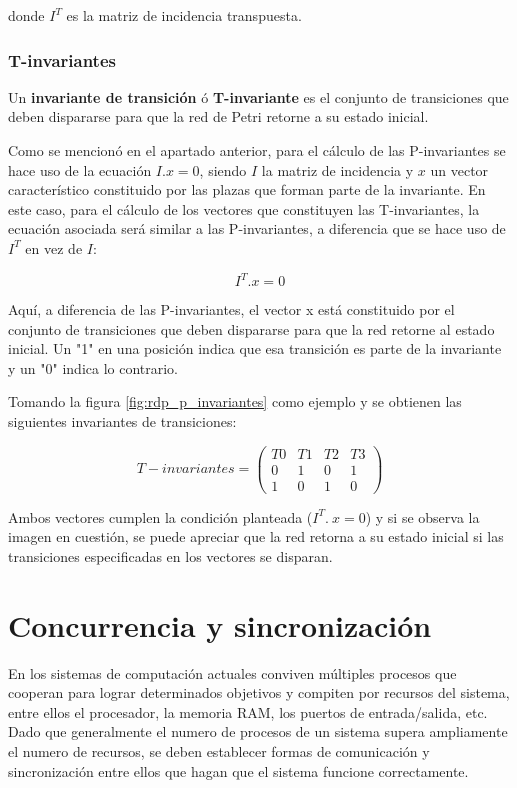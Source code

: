 \noindent donde $I^T$ es la matriz de incidencia transpuesta.

\subsubsection{T-invariantes}
Un \textbf{invariante de transición} ó \textbf{T-invariante} es el conjunto de transiciones que deben dispararse para que la red de Petri retorne a su estado inicial.

Como se mencionó en el apartado anterior, para el cálculo de las P-invariantes se hace uso de la ecuación $I . x = 0$, siendo $I$ la matriz de incidencia y $x$ un vector característico constituido por las plazas que forman parte de la invariante. En este caso, para el cálculo de los vectores que constituyen las T-invariantes, la ecuación asociada será similar a las P-invariantes, a diferencia que se hace uso de  $I^T$ en vez de $I$:

\begin{equation}
    I^T . x = 0
\end{equation}

Aquí, a diferencia de las P-invariantes, el vector x está constituido por el conjunto de transiciones que deben dispararse para que la red retorne al estado inicial. Un "1" en una posición indica que esa transición es parte de la invariante y un "0" indica lo contrario.

Tomando la figura \ref{fig:rdp_p_invariantes} como ejemplo y se obtienen las siguientes invariantes de transiciones:

\begin{equation}
    T-invariantes = 
    \begin{pmatrix}
         T0 & T1 & T2 & T3  \\
         0 & 1 & 0 & 1  \\
         1 & 0 & 1 & 0  
    \end{pmatrix}
\end{equation}

Ambos vectores cumplen la condición planteada ($I^T .\ x = 0$) y si se observa la imagen en cuestión, se puede apreciar que la red retorna a su estado inicial si las transiciones especificadas en los vectores se disparan.

\section{Concurrencia y sincronización}
En los sistemas de computación actuales conviven múltiples procesos que cooperan para lograr determinados objetivos y compiten por recursos del sistema, entre ellos el procesador, la memoria RAM, los puertos de entrada/salida, etc.\\
Dado que generalmente el numero de procesos de un sistema supera ampliamente el numero de recursos, se deben establecer formas de comunicación y sincronización entre ellos que hagan que el sistema funcione correctamente. 

